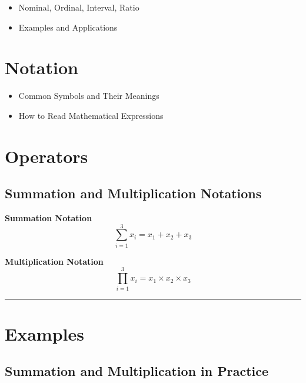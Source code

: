 \documentclass[
  11pt,
  letterpaper,
  DIV=11,
  numbers=noendperiod]{scrartcl}
\providecommand{\tightlist}{%
  \setlength{\itemsep}{0pt}\setlength{\parskip}{0pt}}\usepackage{longtable,booktabs,array}
\begin{document}
\begin{itemize}
\tightlist
\item
  Nominal, Ordinal, Interval, Ratio
\end{itemize}

\begin{itemize}
\tightlist
\item
  Examples and Applications
\end{itemize}

\section{Notation}\label{notation}

\begin{itemize}
\tightlist
\item
  Common Symbols and Their Meanings
\end{itemize}

\begin{itemize}
\tightlist
\item
  How to Read Mathematical Expressions
\end{itemize}

\section{Operators}\label{operators-1}

\subsection{Summation and Multiplication
Notations}\label{summation-and-multiplication-notations}

\textbf{Summation Notation} \[ \sum_{i=1}^{3} x_i = x_1 + x_2 + x_3
\]

\textbf{Multiplication Notation} \[
\prod_{i=1}^{3} x_i = x_1 \times x_2 \times x_3
\]

\begin{center}\rule{0.5\linewidth}{0.5pt}\end{center}

\section{Examples}\label{examples}

\subsection{Summation and Multiplication in
Practice}\label{summation-and-multiplication-in-practice}
\end{document}
